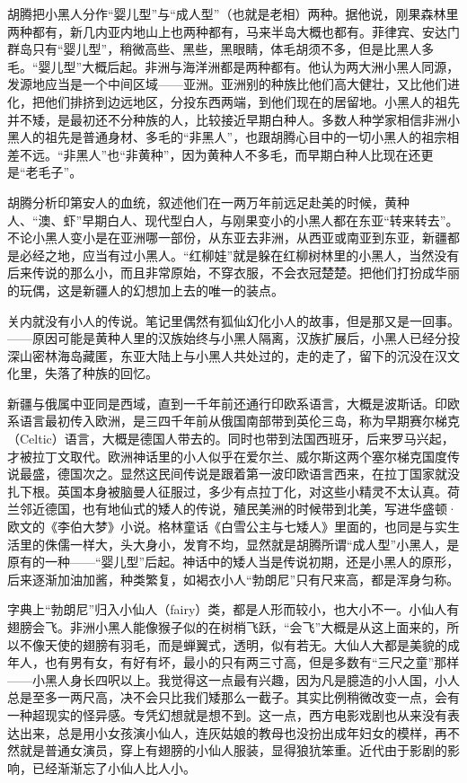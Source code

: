 \par 胡腾把小黑人分作“婴儿型”与“成人型”（也就是老相）两种。据他说，刚果森林里两种都有，新几内亚内地山上也两种都有，马来半岛大概也都有。菲律宾、安达门群岛只有“婴儿型”，稍微高些、黑些，黑眼睛，体毛胡须不多，但是比黑人多毛。“婴儿型”大概后起。非洲与海洋洲都是两种都有。他认为两大洲小黑人同源，发源地应当是一个中间区域——亚洲。亚洲别的种族比他们高大健壮，又比他们进化，把他们排挤到边远地区，分投东西两端，到他们现在的居留地。小黑人的祖先并不矮，是最初还不分种族的人，比较接近早期白种人。多数人种学家相信非洲小黑人的祖先是普通身材、多毛的“非黑人”，也跟胡腾心目中的一切小黑人的祖宗相差不远。“非黑人”也“非黄种”，因为黄种人不多毛，而早期白种人比现在还更是“老毛子”。
\par 胡腾分析印第安人的血统，叙述他们在一两万年前远足赴美的时候，黄种人、“澳、虾”早期白人、现代型白人，与刚果变小的小黑人都在东亚“转来转去”。不论小黑人变小是在亚洲哪一部份，从东亚去非洲，从西亚或南亚到东亚，新疆都是必经之地，应当有过小黑人。“红柳娃”就是躲在红柳树林里的小黑人，当然没有后来传说的那么小，而且非常原始，不穿衣服，不会衣冠楚楚。把他们打扮成华丽的玩偶，这是新疆人的幻想加上去的唯一的装点。
\par 关内就没有小人的传说。笔记里偶然有狐仙幻化小人的故事，但是那又是一回事。——原因可能是黄种人里的汉族始终与小黑人隔离，汉族扩展后，小黑人已经分投深山密林海岛藏匿，东亚大陆上与小黑人共处过的，走的走了，留下的沉没在汉文化里，失落了种族的回忆。
\par 新疆与俄属中亚同是西域，直到一千年前还通行印欧系语言，大概是波斯话。印欧系语言最初传入欧洲，是三四千年前从俄国南部带到英伦三岛，称为早期赛尔梯克（Celtic）语言，大概是德国人带去的。同时也带到法国西班牙，后来罗马兴起，才被拉丁文取代。欧洲神话里的小人似乎在爱尔兰、威尔斯这两个塞尔梯克国度传说最盛，德国次之。显然这民间传说是跟着第一波印欧语言西来，在拉丁国家就没扎下根。英国本身被脑曼人征服过，多少有点拉丁化，对这些小精灵不太认真。荷兰邻近德国，也有地仙式的矮人的传说，殖民美洲的时候带到北美，写进华盛顿·欧文的《李伯大梦》小说。格林童话《白雪公主与七矮人》里面的，也同是与实生活里的侏儒一样大，头大身小，发育不均，显然就是胡腾所谓“成人型”小黑人，是原有的一种——“婴儿型”后起。神话中的矮人当是传说初期，还是小黑人的原形，后来逐渐加油加酱，种类繁复，如褐衣小人“勃朗尼”只有尺来高，都是浑身匀称。
\par 字典上“勃朗尼”归入小仙人（fairy）类，都是人形而较小，也大小不一。小仙人有翅膀会飞。非洲小黑人能像猴子似的在树梢飞跃，“会飞”大概是从这上面来的，所以不像天使的翅膀有羽毛，而是蝉翼式，透明，似有若无。大仙人大都是美貌的成年人，也有男有女，有好有坏，最小的只有两三寸高，但是多数有“三尺之童”那样——小黑人身长四呎以上。我觉得这一点最有兴趣，因为凡是臆造的小人国，小人总是至多一两尺高，决不会只比我们矮那么一截子。其实比例稍微改变一点，会有一种超现实的怪异感。专凭幻想就是想不到。这一点，西方电影戏剧也从来没有表达出来，总是用小女孩演小仙人，连灰姑娘的教母也没扮出成年妇女的模样，再不然就是普通女演员，穿上有翅膀的小仙人服装，显得狼犺笨重。近代由于影剧的影响，已经渐渐忘了小仙人比人小。
